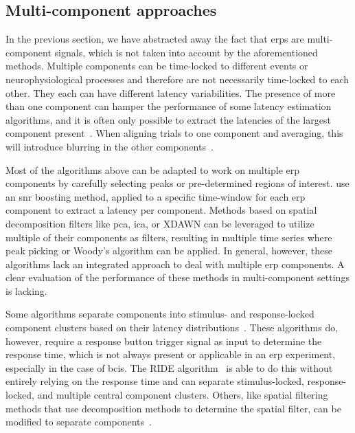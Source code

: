 \subsection{Multi-component approaches}
\label{sec:wcble/literature/multi-comp}
In the previous section, we have abstracted away the fact that \acp{erp} are
multi-component signals, which is not taken into account by the aforementioned
methods.
Multiple components can be time-locked to different events or neurophysiological
processes and therefore are not necessarily time-locked to each other. They
each can have different latency variabilities.
The presence of more than one component can hamper the
performance of some latency estimation algorithms, and it is often only possible to extract the latencies of the largest component present~\cite{Ouyang2017}. When aligning trials
to one component and averaging, this will introduce blurring in the other
components~\cite{Ouyang2020}.

Most of the algorithms above can be adapted to work on multiple \ac{erp} components
by carefully selecting peaks or pre-determined regions of interest.
\textcite{Hardiansyah2020} use an \ac{snr} boosting method, applied to a specific
time-window for each \ac{erp} component to extract a latency per component.
Methods based on spatial decomposition filters like \ac{pca}, \ac{ica}, or XDAWN can be leveraged
to utilize multiple of their components as filters, resulting in multiple time
series where peak picking or Woody's algorithm can be applied. In general,
however, these algorithms lack an integrated approach to deal with multiple
\ac{erp} components. A clear evaluation of the performance of these
methods in multi-component settings is lacking.

Some algorithms separate components into stimulus- and response-locked component clusters based on their
latency distributions~\cite{Jung2001, Takeda2008, Zhang1998, Yin2009}.
These algorithms do, however, require a response
button trigger signal as input to determine the response time, which is
not always present or applicable in an \ac{erp} experiment, especially in
the case of \acp{bci}.
The RIDE algorithm~\cite{Ouyang2011, Ouyang2015, Wang2015, Ouyang2016, Ouyang2020}
is able to do this without entirely relying on the response time and can
separate stimulus-locked, response-locked, and multiple central component clusters.
Others, like spatial filtering methods that use decomposition methods to
determine the spatial filter, can be modified to separate
components~\cite{Ouyang2017}.

